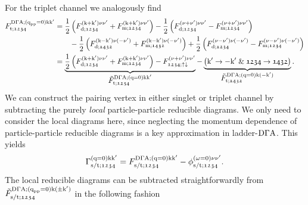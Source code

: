 \documentclass[\main/main.tex]{subfiles}
\begin{document}
For the triplet channel we analogously find
\begin{align}\label{eq:ladder_f_trip}
\begin{split}
	F_{\text{t};\mathfrak{1234}}^{\text{D}\Gamma\text{A};(\text{q}_{\text{pp}}=0)\text{k}\text{k}'}&=\frac12\left (F_{\text{d};\mathfrak{1234}}^{(\text{k}+\text{k}')\nu\nu'}+F_{\text{m};\mathfrak{1234}}^{(\text{k}+\text{k}')\nu\nu'}\right )-\frac12\left (F_{\text{d};\mathfrak{1234}}^{(\nu+\nu')\nu\nu'}-F_{\text{m};\mathfrak{1234}}^{(\nu+\nu')\nu\nu'}\right )\\
	&\qquad-\frac12\left (F_{\text{d};\mathfrak{1432}}^{(\text{k}-\text{k}')\nu(-\nu')}+F_{\text{m};\mathfrak{1432}}^{(\text{k}-\text{k}')\nu(-\nu')}\right )+\frac12\left (F_{\text{d};\mathfrak{1234}}^{(\nu-\nu')\nu(-\nu')}-F_{\text{m};\mathfrak{1234}}^{(\nu-\nu')\nu(-\nu')}\right )\\
	&=\underbrace{\frac12\left (F_{\text{d};\mathfrak{1234}}^{(\text{k}+\text{k}')\nu\nu'}+F_{\text{m};\mathfrak{1234}}^{(\text{k}+\text{k}')\nu\nu'}\right )-F_{\mathfrak{1234};\uparrow\downarrow}^{(\nu+\nu')\nu\nu'}}_{\textstyle\tilde{F}_{\text{t};\mathfrak{1234}}^{\text{D}\Gamma\text{A};(\text{q}=0)\text{k}\text{k}'}}-\underbrace{\left (\text{k}'\rightarrow -\text{k}'\;\&\; \mathfrak{1234}\rightarrow\mathfrak{1432}\right )}_{\textstyle\tilde{F}_{\text{t};\mathfrak{1432}}^{\text{D}\Gamma\text{A};(\text{q}=0)\text{k}(-\text{k}')}}.
\end{split}
\end{align}
We can construct the pairing vertex in either singlet or triplet channel by subtracting the purely \textit{local} particle-particle reducible diagrams. We only need to consider the local diagrams here, since neglecting the momentum dependence of particle-particle reducible diagrams is a key approximation in ladder-$\text{D}\Gamma\text{A}$. This yields
\begin{align}
	\Gamma_{\text{s}/\text{t};\mathfrak{1234}}^{(\text{q}=0)\text{k}\text{k}'}=F_{\text{s}/\text{t};\mathfrak{1234}}^{\text{D}\Gamma\text{A};(\text{q}=0)\text{k}\text{k}'}-\phi_{\text{s}/\text{t};\mathfrak{1234}}^{(\omega=0)\nu\nu'}.
\end{align}
The local reducible diagrams can be subtracted straightforwardly from $\tilde{F}_{\text{s}/\text{t};\mathfrak{1234}}^{\text{D}\Gamma\text{A};(\text{q}_{\text{pp}}=0)\text{k}(\pm\text{k}')}$ in the following fashion
\end{document}
